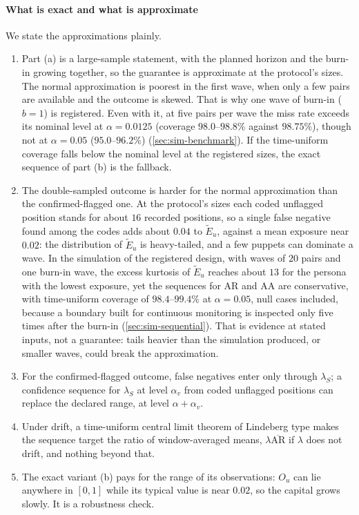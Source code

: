 \paragraph{What is exact and what is approximate}
We state the approximations plainly.
\begin{enumerate}[(1)]
  \item Part (a) is a large-sample statement, with the planned horizon and the burn-in growing together, so the guarantee is approximate at the protocol's sizes. The normal approximation is poorest in the first wave, when only a few pairs are available and the outcome is skewed. That is why one wave of burn-in ($b=1$) is registered. Even with it, at five pairs per wave the miss rate exceeds its nominal level at $\alpha=0.0125$ (coverage $98.0$--$98.8\%$ against $98.75\%$), though not at $\alpha=0.05$ ($95.0$--$96.2\%$) (\cref{sec:sim-benchmark}). If the time-uniform coverage falls below the nominal level at the registered sizes, the exact sequence of part (b) is the fallback.
  \item The double-sampled outcome is harder for the normal approximation than the confirmed-flagged one. At the protocol's sizes each coded unflagged position stands for about $16$ recorded positions, so a single false negative found among the codes adds about $0.04$ to $\widetilde E_u$, against a mean exposure near $0.02$: the distribution of $\widetilde E_u$ is heavy-tailed, and a few puppets can dominate a wave.
  In the simulation of the registered design, with waves of $20$ pairs and one burn-in wave, the excess kurtosis of $\widetilde E_u$ reaches about $13$ for the persona with the lowest exposure, yet the sequences for $\mathrm{AR}$ and $\mathrm{AA}$ are conservative, with time-uniform coverage of $98.4$--$99.4\%$ at $\alpha=0.05$, null cases included, because a boundary built for continuous monitoring is inspected only five times after the burn-in (\cref{sec:sim-sequential}). That is evidence at stated inputs, not a guarantee: tails heavier than the simulation produced, or smaller waves, could break the approximation.
  \item For the confirmed-flagged outcome, false negatives enter only through $\lambda_S$; a confidence sequence for $\lambda_S$ at level $\alpha_v$ from coded unflagged positions can replace the declared range, at level $\alpha+\alpha_v$.
  \item Under drift, a time-uniform central limit theorem of Lindeberg type \citep{waudbysmith2024asymp} makes the sequence target the ratio of window-averaged means, $\lambda\overline{\mathrm{AR}}$ if $\lambda$ does not drift, and nothing beyond that.
  \item The exact variant (b) pays for the range of its observations: $O_u$ can lie anywhere in $[0,1]$ while its typical value is near $0.02$, so the capital grows slowly. It is a robustness check.
\end{enumerate}

